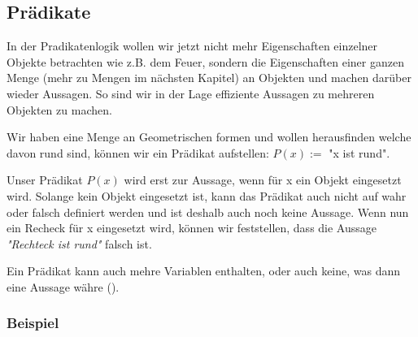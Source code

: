 \documentclass[a4paper,12pt]{article}
\begin{document}
\subsection{Prädikate}
In der Pradikatenlogik wollen wir jetzt nicht mehr Eigenschaften einzelner Objekte betrachten wie z.B. dem Feuer,
sondern die Eigenschaften einer ganzen Menge (mehr zu Mengen im nächsten Kapitel) an Objekten und machen darüber wieder Aussagen. So sind wir in der Lage effiziente Aussagen zu mehreren Objekten zu machen.

Wir haben eine Menge an Geometrischen formen und wollen herausfinden welche davon rund sind, können wir ein Prädikat aufstellen: \( P(x) := \) "x ist rund".


Unser Prädikat \( P(x) \) wird erst zur Aussage, wenn für x ein Objekt eingesetzt wird. Solange kein Objekt eingesetzt ist, kann das Prädikat auch nicht auf wahr oder falsch definiert werden und ist deshalb auch noch keine Aussage. Wenn nun ein Recheck für x eingesetzt wird, können wir feststellen, dass die Aussage \textit{"Rechteck ist rund"} falsch ist.

Ein Prädikat kann auch mehre Variablen enthalten, oder auch keine, was dann eine Aussage währe ().


\subsubsection*{Beispiel}
\end{document}
